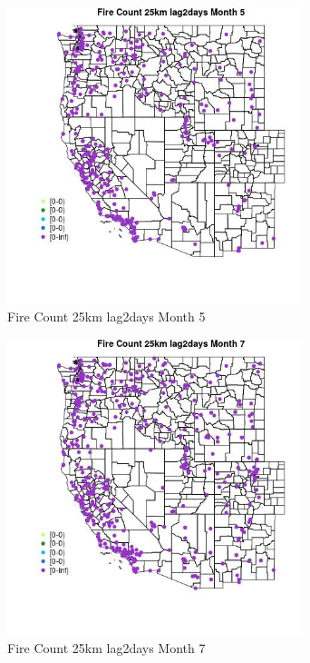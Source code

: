 \begin{figure} 
\centering  
\includegraphics[width=0.77\textwidth]{Code_Outputs/Report_ML_input_PM25_Step4_part_e_de_duplicated_aves_compiled_2019-05-18wNAs_MapObsMo5Fire_Count_25km_lag2days.jpg} 
\caption{\label{fig:Report_ML_input_PM25_Step4_part_e_de_duplicated_aves_compiled_2019-05-18wNAsMapObsMo5Fire_Count_25km_lag2days}Fire Count 25km lag2days Month 5} 
\end{figure} 
 

\begin{figure} 
\centering  
\includegraphics[width=0.77\textwidth]{Code_Outputs/Report_ML_input_PM25_Step4_part_e_de_duplicated_aves_compiled_2019-05-18wNAs_MapObsMo7Fire_Count_25km_lag2days.jpg} 
\caption{\label{fig:Report_ML_input_PM25_Step4_part_e_de_duplicated_aves_compiled_2019-05-18wNAsMapObsMo7Fire_Count_25km_lag2days}Fire Count 25km lag2days Month 7} 
\end{figure} 
 

